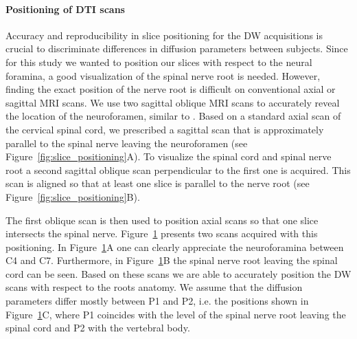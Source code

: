 \paragraph{Positioning of DTI scans} Accuracy and reproducibility in slice positioning for the DW acquisitions is crucial to discriminate differences in diffusion parameters between subjects. Since for this study we wanted to position our slices with respect to the neural foramina, a good visualization of the spinal nerve root is needed. However, finding the exact position of the nerve root is difficult on conventional axial or sagittal MRI scans. We use two sagittal oblique MRI scans to accurately reveal the location of the neuroforamen, similar to \citet{Goodman:2006}. Based on a standard axial scan of the cervical spinal cord, we prescribed a sagittal scan that is approximately parallel to the spinal nerve leaving the neuroforamen (see Figure~\ref{fig:slice_positioning}A). To visualize the spinal cord and spinal nerve root a second sagittal oblique scan perpendicular to the first one is acquired. This scan is aligned so that at least one slice is parallel to the nerve root (see Figure~\ref{fig:slice_positioning}B). 


The first oblique scan is then used to position axial scans so that one slice intersects the spinal nerve. Figure~\ref{fig:oblique_scans} presents two scans acquired with this positioning. In Figure~\ref{fig:oblique_scans}A one can clearly appreciate the neuroforamina between C4 and C7. Furthermore, in Figure~\ref{fig:oblique_scans}B the spinal nerve root leaving the spinal cord can be seen. Based on these scans we are able to accurately position the DW scans with respect to the roots anatomy. We assume that the diffusion parameters differ mostly between P1 and P2, i.e. the positions shown in Figure~\ref{fig:oblique_scans}C, where P1 coincides with the level of the spinal nerve root leaving the spinal cord and P2 with the vertebral body.

\begin{figure}
 \centering
  \label{fig:oblique_scans}
\end{figure} 

